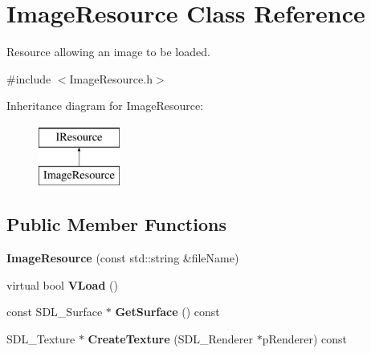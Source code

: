 \hypertarget{classImageResource}{\section{Image\-Resource Class Reference}
\label{classImageResource}
}


Resource allowing an image to be loaded.  




{\ttfamily \#include $<$Image\-Resource.\-h$>$}

Inheritance diagram for Image\-Resource\-:\begin{figure}[H]
\begin{center}
\leavevmode
\includegraphics[height=2.000000cm]{classImageResource}
\end{center}
\end{figure}
\subsection*{Public Member Functions}
\begin{DoxyCompactItemize}
\item 
\hypertarget{classImageResource_a47182ef616572c0b21684f85d47a4347}{{\bfseries Image\-Resource} (const std\-::string \&file\-Name)}\label{classImageResource_a47182ef616572c0b21684f85d47a4347}

\item 
\hypertarget{classImageResource_abd733816697d73a18f81ef546e62fb15}{virtual bool {\bfseries V\-Load} ()}\label{classImageResource_abd733816697d73a18f81ef546e62fb15}

\item 
\hypertarget{classImageResource_a7655118085f969a351dcba4940c08da2}{const S\-D\-L\-\_\-\-Surface $\ast$ {\bfseries Get\-Surface} () const }\label{classImageResource_a7655118085f969a351dcba4940c08da2}

\item 
\hypertarget{classImageResource_ab9f7a7460de637eef3984b2a599397ba}{S\-D\-L\-\_\-\-Texture $\ast$ {\bfseries Create\-Texture} (S\-D\-L\-\_\-\-Renderer $\ast$p\-Renderer) const }\label{classImageResource_ab9f7a7460de637eef3984b2a599397ba}

\end{DoxyCompactItemize}


